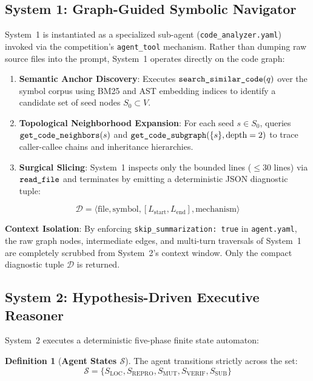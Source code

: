 \documentclass[10pt,twocolumn,letterpaper]{article}
\theoremstyle{definition}
\newtheorem{definition}{Definition}
\begin{document}
\subsection{System 1: Graph-Guided Symbolic Navigator}
System~1 is instantiated as a specialized sub-agent (\texttt{code\_analyzer.yaml}) invoked via the competition's \texttt{agent\_tool} mechanism. Rather than dumping raw source files into the prompt, System~1 operates directly on the code graph:
\begin{enumerate}
    \item \textbf{Semantic Anchor Discovery}: Executes $\text{\texttt{search\_similar\_code}}(q)$ over the symbol corpus using BM25 and AST embedding indices to identify a candidate set of seed nodes $S_0 \subset V$.
    \item \textbf{Topological Neighborhood Expansion}: For each seed $s \in S_0$, queries $\text{\texttt{get\_code\_neighbors}}(s)$ and $\text{\texttt{get\_code\_subgraph}}(\{s\}, \text{depth}=2)$ to trace caller-callee chains and inheritance hierarchies.
    \item \textbf{Surgical Slicing}: System~1 inspects only the bounded lines ($\le 30$ lines) via $\text{\texttt{read\_file}}$ and terminates by emitting a deterministic JSON diagnostic tuple:
\end{enumerate}

\begin{equation}
    \mathcal{D} = \langle \text{file}, \text{symbol}, [L_{\text{start}}, L_{\text{end}}], \text{mechanism} \rangle
\end{equation}

\noindent \textbf{Context Isolation}: By enforcing \texttt{skip\_summarization: true} in \texttt{agent.yaml}, the raw graph nodes, intermediate edges, and multi-turn traversals of System~1 are completely scrubbed from System~2's context window. Only the compact diagnostic tuple $\mathcal{D}$ is returned.

\subsection{System 2: Hypothesis-Driven Executive Reasoner}
System~2 executes a deterministic five-phase finite state automaton:

\begin{definition}[\textbf{Agent States $\mathcal{S}$}]
The agent transitions strictly across the set:
\begin{equation}
    \mathcal{S} = \{ S_{\text{LOC}}, S_{\text{REPRO}}, S_{\text{MUT}}, S_{\text{VERIF}}, S_{\text{SUB}} \}
\end{equation}
\end{definition}
\end{document}
